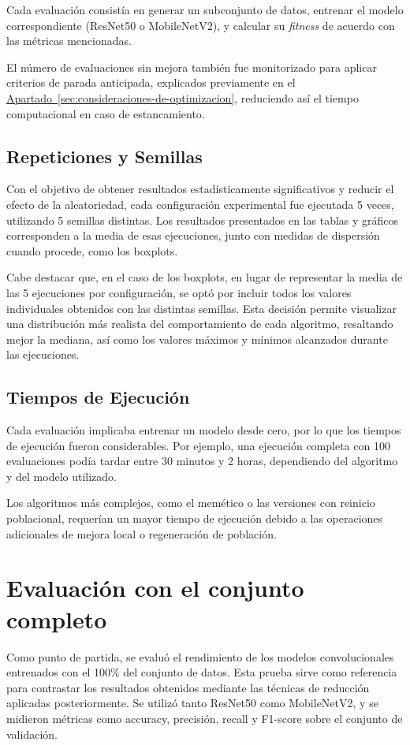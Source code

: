 Cada evaluación consistía en generar un subconjunto de datos, entrenar el modelo correspondiente (ResNet50 o MobileNetV2),
y calcular su \textit{fitness} de acuerdo con las métricas mencionadas.

El número de evaluaciones sin mejora también fue monitorizado para aplicar criterios de parada anticipada,
explicados previamente en el \hyperref[sec:consideraciones-de-optimizacion]{Apartado~\ref*{sec:consideraciones-de-optimizacion}},
reduciendo así el tiempo computacional en caso de estancamiento.

\subsection{Repeticiones y Semillas}\label{sec:repeticiones-y-semillas}
Con el objetivo de obtener resultados estadísticamente significativos y reducir el efecto de la aleatoriedad,
cada configuración experimental fue ejecutada 5 veces, utilizando 5 semillas distintas.
Los resultados presentados en las tablas y gráficos corresponden a la media de esas ejecuciones,
junto con medidas de dispersión cuando procede, como los boxplots.

Cabe destacar que, en el caso de los boxplots, en lugar de representar la media de las 5 ejecuciones por configuración,
se optó por incluir todos los valores individuales obtenidos con las distintas semillas.
Esta decisión permite visualizar una distribución más realista del comportamiento de cada algoritmo,
resaltando mejor la mediana, así como los valores máximos y mínimos alcanzados durante las ejecuciones.

\subsection{Tiempos de Ejecución}\label{sec:tiempos-de-ejecucion}
Cada evaluación implicaba entrenar un modelo desde cero, por lo que los tiempos de ejecución fueron considerables.
Por ejemplo, una ejecución completa con 100 evaluaciones podía tardar entre 30 minutos y 2 horas,
dependiendo del algoritmo y del modelo utilizado.

Los algoritmos más complejos, como el memético o las versiones con reinicio poblacional,
requerían un mayor tiempo de ejecución debido a las operaciones adicionales de mejora local o regeneración de población.


\section{Evaluación con el conjunto completo}\label{sec:evaluacion-con-el-conjunto-completo}
Como punto de partida, se evaluó el rendimiento de los modelos convolucionales entrenados con el 100\% del conjunto de datos.
Esta prueba sirve como referencia para contrastar los resultados obtenidos mediante las técnicas de reducción aplicadas posteriormente.
Se utilizó tanto ResNet50 como MobileNetV2, y se midieron métricas como accuracy, precisión, recall y F1-score sobre el conjunto de validación.

